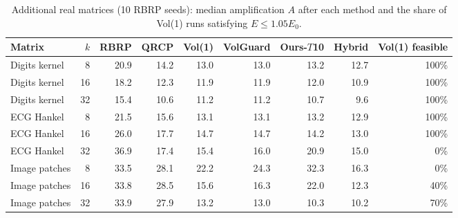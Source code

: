 \begin{table}[t]
\centering\small
\caption{Additional real matrices (10 RBRP seeds): median amplification $A$ after each method and the share of Vol(1) runs satisfying $E\le1.05E_0$.}\label{tab:real}
\begin{adjustbox}{max width=\linewidth}
\begin{tabular}{lrrrrrrrr}
\toprule
Matrix & $k$ & RBRP & QRCP & Vol(1) & VolGuard & Ours-$T$10 & Hybrid & Vol(1) feasible \\
\midrule
Digits kernel & 8 & 20.9 & 14.2 & 13.0 & 13.0 & 13.2 & 12.7 & 100\% \\
Digits kernel & 16 & 18.2 & 12.3 & 11.9 & 11.9 & 12.0 & 10.9 & 100\% \\
Digits kernel & 32 & 15.4 & 10.6 & 11.2 & 11.2 & 10.7 & 9.6 & 100\% \\
ECG Hankel & 8 & 21.5 & 15.6 & 13.1 & 13.1 & 13.2 & 12.9 & 100\% \\
ECG Hankel & 16 & 26.0 & 17.7 & 14.7 & 14.7 & 14.2 & 13.0 & 100\% \\
ECG Hankel & 32 & 36.9 & 17.4 & 15.4 & 16.0 & 20.9 & 15.0 & 0\% \\
Image patches & 8 & 33.5 & 28.1 & 22.2 & 24.3 & 32.3 & 16.3 & 0\% \\
Image patches & 16 & 33.8 & 28.5 & 15.6 & 16.3 & 22.0 & 12.3 & 40\% \\
Image patches & 32 & 33.9 & 27.9 & 13.2 & 13.0 & 10.3 & 10.2 & 70\% \\
\bottomrule
\end{tabular}
\end{adjustbox}
\end{table}
